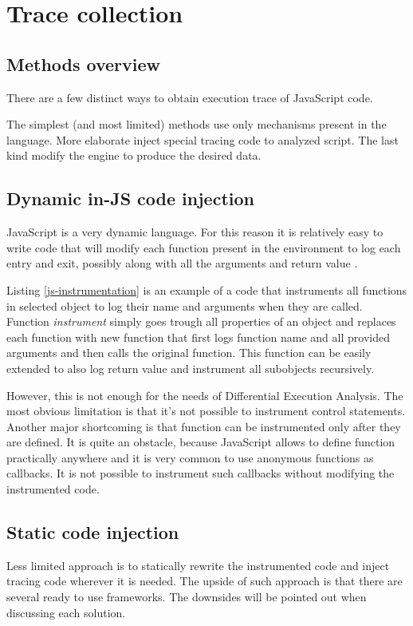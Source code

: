\chapter{Trace collection}

\section{Methods overview}
There are a few distinct ways to obtain execution trace of JavaScript code. 

The simplest (and most limited) methods use only mechanisms present in the language.
More elaborate inject special tracing code to analyzed script. The last kind modify the engine to produce
the desired data.

\section{Dynamic in-JS code injection}
JavaScript is a very dynamic language. For this reason it is relatively easy to write code that will
modify each function present in the environment to log each entry and exit,
possibly along with all the arguments and return value \cite{stack:js-console-log}.



Listing \ref{js-instrumentation} is an example of a code that instruments all functions in selected object
to log their name and arguments when they are called.
Function \emph{instrument} simply goes trough all properties of an object and 
replaces each function with new function that first logs function
name and all provided arguments and then calls the original function.
This function can be easily extended to also log return value and instrument all subobjects recursively.

However, this is not enough for the needs of Differential Execution Analysis. 
The most obvious limitation is that it's not possible to instrument control statements.
Another major shortcoming is that function can be instrumented only after they are defined. 
It is quite an obstacle, because JavaScript allows to define function practically anywhere and it is very common
to use anonymous functions as callbacks. It is not possible to instrument such callbacks 
without modifying the instrumented code.

\section{Static code injection}
Less limited approach is to statically rewrite the instrumented code and inject tracing code wherever it is needed.
The upside of such approach is that there are several ready to use frameworks.
The downsides will be pointed out when discussing each solution.

